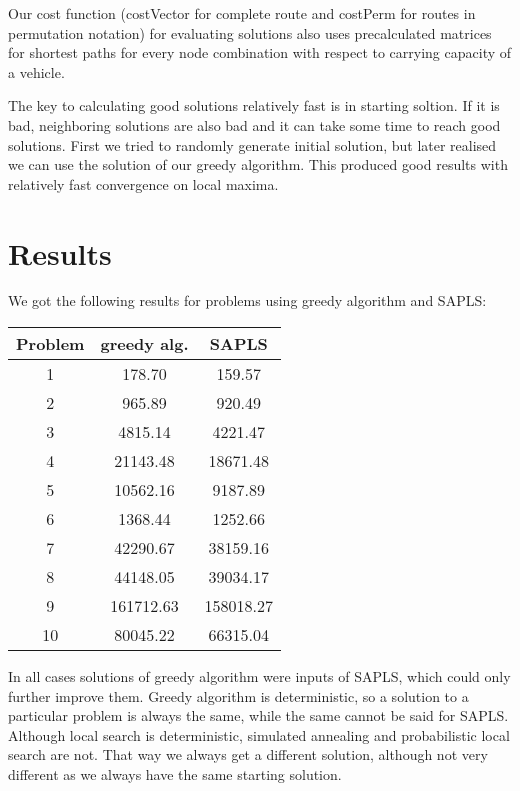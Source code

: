\documentclass[a4paper, 12pt]{article}
\begin{document}
Our cost function ({\sf costVector} for complete route and {\sf costPerm} for
routes in permutation notation) for evaluating solutions also uses
precalculated matrices for shortest paths for every node combination with
respect to carrying capacity of a vehicle.

The key to calculating good solutions relatively fast is in starting soltion.
If it is bad, neighboring solutions are also bad and it can take some time to
reach good solutions. First we tried to randomly generate initial solution, but
later realised we can use the solution of our greedy algorithm. This produced
good results with relatively fast convergence on local maxima.

\section{Results}

We got the following results for problems using greedy algorithm and SAPLS:
\begin{center}
\begin{tabular}{ c|cc }
	Problem & greedy alg. & SAPLS \\
	\hline
	1 & 178.70 & 159.57 \\
	2 & 965.89 & 920.49 \\
	3 & 4815.14 & 4221.47 \\
	4 & 21143.48 & 18671.48 \\
	5 & 10562.16 & 9187.89 \\
	6 & 1368.44 & 1252.66 \\
	7 & 42290.67 & 38159.16 \\
	8 & 44148.05 & 39034.17 \\
	9 & 161712.63 & 158018.27 \\
	10 & 80045.22 & 66315.04 \\
\end{tabular}
\end{center}

In all cases solutions of greedy algorithm were inputs of SAPLS, which could
only further improve them. Greedy algorithm is deterministic, so a solution to
a particular problem is always the same, while the same cannot be said for SAPLS.
Although local search is deterministic, simulated annealing and probabilistic
local search are not. That way we always get a different solution, although not
very different as we always have the same starting solution.
\end{document}
